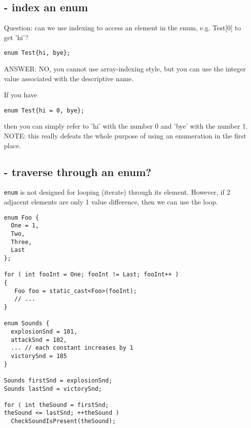 % 
% 


\subsection{- index an enum}

Question: can we use indexing to access an element in the enum, e.g. Test[0] to
get 'hi'? 
\begin{lstlisting}
enum Test{hi, bye};
\end{lstlisting}

ANSWER: NO, you cannot use array-indexing style, but you can use the 
integer value associated with the descriptive name.
  
If you have
\begin{verbatim}
enum Test{hi = 0, bye};
\end{verbatim}
then you can simply refer to 'hi' with the number 0 and 'bye'
with the number 1. NOTE: this really defeats the whole purpose of using an
enumeration in the first place.
  




\subsection{- traverse through an enum?}

\verb!enum! is not designed for looping (iterate) through its element.
However, if 2 adjacent elements are only 1 value difference, then we can use
the loop.
\begin{verbatim}
enum Foo {
  One = 1,
  Two,
  Three,
  Last
};

for ( int fooInt = One; fooInt != Last; fooInt++ )
{
   Foo foo = static_cast<Foo>(fooInt);
   // ...
}

enum Sounds {
  explosionSnd = 101,
  attackSnd = 102,
  ... // each constant increases by 1
  victorySnd = 185
}

Sounds firstSnd = explosionSnd;
Sounds lastSnd = victorySnd;

for ( int theSound = firstSnd;
theSound <= lastSnd; ++theSound )
  CheckSoundIsPresent(theSound); 
\end{verbatim}

